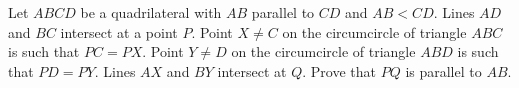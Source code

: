 Let $ABCD$ be a quadrilateral with $AB$ parallel to $CD$ and $AB < CD$. Lines $AD$ and $BC$ intersect at a point $P$. Point $X \neq C$ on the circumcircle of triangle $ABC$ is such that $PC = PX$. Point $Y \neq D$ on the circumcircle of triangle $ABD$ is such that $PD = PY$. Lines $AX$ and $BY$ intersect at $Q$. Prove that $PQ$ is parallel to $AB$.
